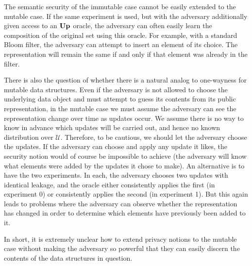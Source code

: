 The semantic security of the immutable case cannot be easily extended to the mutable case. If the same experiment is used, but with the adversary additionally given access to an $\mathbf{Up}\hspace{0.5pt}$ oracle, the adversary can often easily learn the composition of the original set using this oracle. For example, with a standard Bloom filter, the adversary can attempt to insert an element of its choice. The representation will remain the same if and only if that element was already in the filter.

There is also the question of whether there is a natural analog to one-wayness for mutable data structures. Even if the adversary is not allowed to choose the underlying data object and must attempt to guess its contents from its public representation, in the mutable case we must assume the adversary can see the representation change over time as updates occur. We assume there is no way to know in advance which updates will be carried out, and hence no known distribution over $\mathcal{U}$. Therefore, to be cautious, we should let the adversary choose the updates. If the adversary can choose and apply any update it likes, the security notion would of course be impossible to achieve (the adversary will know what elements were added by the updates it chose to make). An alternative is to have the two experiments. In each, the adversary chooses two updates with identical leakage, and the oracle either consistently applies the first (in experiment 0) or consistently applies the second (in experiment 1). But this again leads to problems where the adversary can observe whether the representation has changed in order to determine which elements have previously been added to it.

In short, it is extremely unclear how to extend privacy notions to the mutable case without making the adversary so powerful that they can easily discern the contents of the data structures in question.

